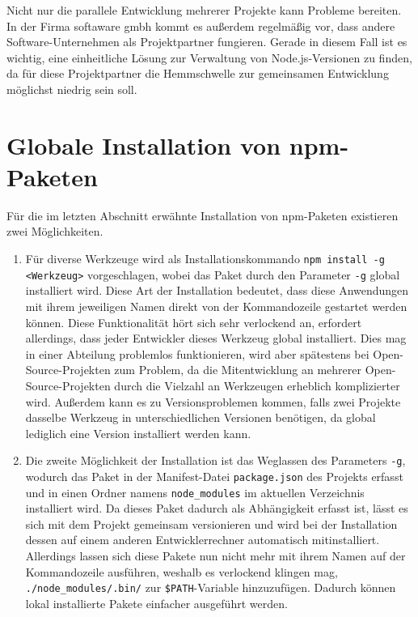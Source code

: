 Nicht nur die parallele Entwicklung mehrerer Projekte kann Probleme bereiten.
In der Firma softaware gmbh kommt es außerdem regelmäßig vor, dass andere Software-Unternehmen als Projektpartner fungieren.
Gerade in diesem Fall ist es wichtig, eine einheitliche Lösung zur Verwaltung von Node.js-Versionen zu finden, da für diese Projektpartner die Hemmschwelle zur gemeinsamen Entwicklung möglichst niedrig sein soll.


\section{Globale Installation von npm-Paketen}
\label{sec:global-package-installation}
Für die im letzten Abschnitt erwähnte Installation von npm-Paketen existieren zwei Möglichkeiten.

\begin{enumerate}
    \item Für diverse Werkzeuge wird als Installationskommando \verb|npm install -g <Werkzeug>| vorgeschlagen, wobei das Paket durch den Parameter \verb|-g| global installiert wird.
    Diese Art der Installation bedeutet, dass diese Anwendungen mit ihrem jeweiligen Namen direkt von der Kommandozeile gestartet werden können.
    Diese Funktionalität hört sich sehr verlockend an, erfordert allerdings, dass jeder Entwickler dieses Werkzeug global installiert.
    Dies mag in einer Abteilung problemlos funktionieren, wird aber spätestens bei Open-Source-Projekten zum Problem, da die Mitentwicklung an mehrerer Open-Source-Projekten durch die Vielzahl an Werkzeugen erheblich komplizierter wird.
    Außerdem kann es zu Versionsproblemen kommen, falls zwei Projekte dasselbe Werkzeug in unterschiedlichen Versionen benötigen, da global lediglich eine Version installiert werden kann.
\item Die zweite Möglichkeit der Installation ist das Weglassen des Parameters \verb|-g|, wodurch das Paket in der Manifest-Datei \verb|package.json| des Projekts erfasst und in einen Ordner namens \verb|node_modules| im aktuellen Verzeichnis installiert wird.
    Da dieses Paket dadurch als Abhängigkeit erfasst ist, lässt es sich mit dem Projekt gemeinsam versionieren und wird bei der Installation dessen auf einem anderen Entwicklerrechner automatisch mitinstalliert.
    Allerdings lassen sich diese Pakete nun nicht mehr mit ihrem Namen auf der Kommandozeile ausführen, weshalb es verlockend klingen mag, \verb|./node_modules/.bin/| zur \verb|$PATH|-Variable hinzuzufügen.
    Dadurch können lokal installierte Pakete einfacher ausgeführt werden.

\end{enumerate}
